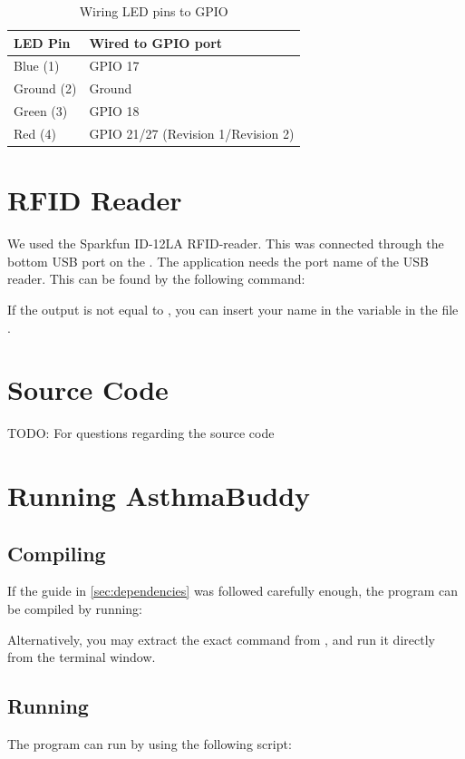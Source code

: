 \begin{table}[H]
\centering
\begin{tabular}{|p{3.0cm}| p{3.0cm}|}
	\hline
	\textbf{LED Pin} & \textbf{Wired to GPIO port}\\
	\hline
	Blue (1) & GPIO 17\\
	\hline
	Ground (2) & Ground\\
	\hline
	Green (3) & GPIO 18\\
	\hline
	Red (4) & GPIO 21/27 (Revision 1/Revision 2)\\
	\hline
\end{tabular}
\caption{Wiring LED pins to GPIO}
\label{tab:wiringgpio}
\end{table}

\section{RFID Reader}
We used the Sparkfun ID-12LA RFID-reader. This was connected through the bottom USB port on the \rpi{}. 
The application needs the port name of the USB reader. This can be found by the following command: 


If the output is not equal to , you can insert your name in the variable  in the file . 
 
\section{Source Code}
\label{sec:sourcecode}
TODO: For questions regarding the source code 


\section{Running AsthmaBuddy}

\subsection{Compiling}
If the guide in \ref{sec:dependencies} was followed carefully enough, the program can be compiled by running:


Alternatively, you may extract the exact command from , and run it directly from the terminal window. 

\subsection{Running}
The program can run by using the following script:

